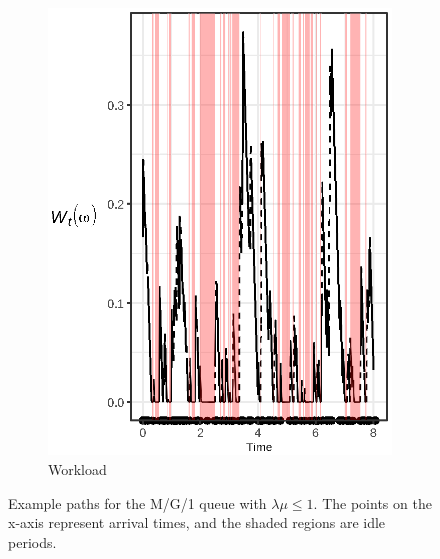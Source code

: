 \documentclass[titlepage]{article}
\theoremstyle{plain}
\theoremstyle{definition}
\begin{document}
{\begin{landscape}
\begin{figure}
\begin{subfigure}{0.45\linewidth}
        \includegraphics{workload_leq_1}
        \caption{Workload}
      \end{subfigure}
      \caption{Example paths for the M/G/1 queue with $\lambda \mu \leq 1$. The points on the x-axis represent arrival times, and the shaded regions are idle periods.}
      \label{fig:example-leq-1}
    \end{figure}
    \pagebreak
    \begin{figure}
      \centering
      \begin{subfigure}{0.45\linewidth}

\end{subfigure}
\end{figure}
\end{landscape}}
\end{document}

